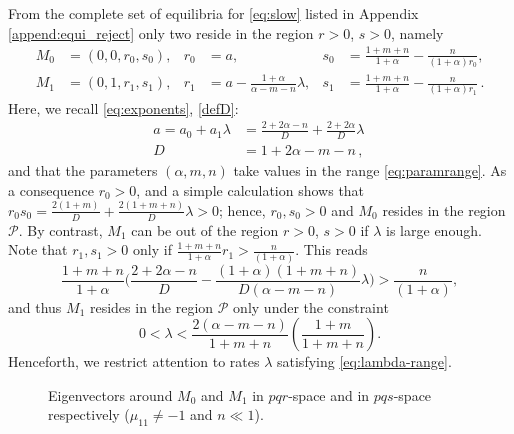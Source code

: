 \documentclass[11pt]{article}
\newcommand{\tcb}{}
\theoremstyle{remark}
\begin{document}
From the complete set of equilibria for \eqref{eq:slow} listed in Appendix \ref{append:equi_reject} only two reside in
the region $r > 0$, $s >0$, namely
\begin{align*}
 M_0 &= (0,0,r_0,s_0), & r_0 & =a , & s_0&=\frac{1+m+n}{1+\alpha} - \frac{n}{(1+\alpha)r_0},\\
 M_1 &= (0,1,r_1,s_1), & r_1 & = a -\frac{1+\alpha}{\alpha-m-n}\lambda, & s_1&=\frac{1+m+n}{1+\alpha} - \frac{n}{(1+\alpha)r_1} \, .
\end{align*}
\tcb{
Here, we recall \eqref{eq:exponents}, \eqref{defD}:
$$
\begin{aligned}
a = a_0 + a_1 \lambda &= \frac{2+2\alpha-n}{D} + \frac{2+2\alpha}{D}\lambda \, \\
D &= 1+2\alpha-m-n  \, ,
\end{aligned}
$$
and that the parameters $(\alpha, m, n)$ take values in the range \eqref{eq:paramrange}. As a consequence
$r_0>0$, and a simple calculation shows that  $r_0s_0 = \frac{2(1+m)}{D} + \frac{2(1+m+n)}{D}\lambda>0$; hence,
$r_0, s_0>0$ and $M_0$  resides in the region $\mathcal{P}$.
}
By contrast, $M_1$ can be out of the region $r>0$, $s>0$ if $\lambda$ is large enough. Note that $r_1,s_1>0$ only if $\frac{1+m+n}{1+\alpha}r_1 > \frac{n}{(1+\alpha)}$. This reads
$$\frac{1+m+n}{1+\alpha}\Big(\frac{2+2\alpha-n}{D} - \frac{(1+\alpha)(1+m+n)}{D(\alpha-m-n)}\lambda\Big) > \frac{n}{(1+\alpha)},$$
and thus $M_1$ resides in the region $\mathcal{P}$ only under the constraint
\begin{equation} \label{eq:lambda-range}
 0< \lambda < \frac{2(\alpha-m-n)}{1+m+n}\left(\frac{1+m}{1+m+n}\right).
\end{equation}
Henceforth, we restrict attention to rates $\lambda$ satisfying \eqref{eq:lambda-range}.

\begin{figure}
 \centering
  \subfigure[$pqr$-space]{
  \psfrag{r}{\scriptsize$r$}%
  \texttt{[image: equilibriapqr.eps]}\label{fig:eq1}
  }
  \quad \quad
  \subfigure[$pqs$-space]{
  \psfrag{r}{\scriptsize$s-\frac{1+m}{1+\alpha}$}%
  \texttt{[image: equilibriapqs.eps]}\label{fig:eq2}
  }
  \caption{Eigenvectors around $M_0$ and $M_1$ in $pqr$-space and in $pqs$-space respectively ($\mu_{11}\ne-1$ and $n\ll1$). } \label{fig:equilibria}
\end{figure}
\end{document}
